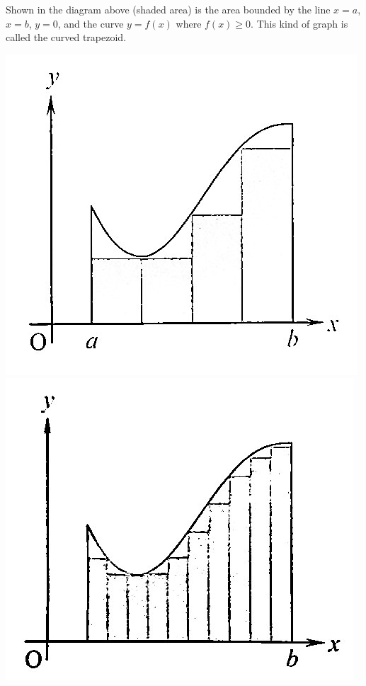 \documentclass{report}
\begin{document}
Shown in the diagram above (shaded area) is the area bounded by the line $x =
    a$, $x = b$, $y = 0$, and the curve $y = f(x)$ where $f(x) \geq 0$. This kind
of graph is called the curved trapezoid.

\begin{center}
    \includegraphics[scale=0.3]{assets/28-1.jpg}
    \includegraphics[scale=0.3]{assets/28-2.jpg}

\end{center}
\end{document}
